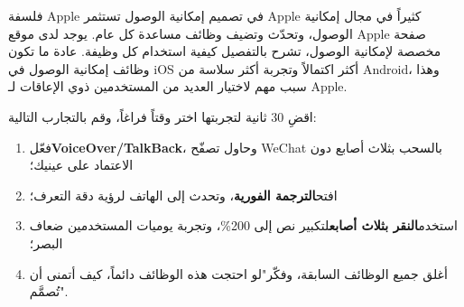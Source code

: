 \begin{tcbinfo}{فلسفة Apple في تصميم إمكانية الوصول}
تستثمر Apple كثيراً في مجال إمكانية الوصول، وتحدّث وتضيف وظائف مساعدة كل عام. يوجد لدى موقع Apple صفحة مخصصة لإمكانية الوصول، تشرح بالتفصيل كيفية استخدام كل وظيفة. عادة ما تكون وظائف إمكانية الوصول في iOS أكثر اكتمالاً وتجربة أكثر سلاسة من Android، وهذا سبب مهم لاختيار العديد من المستخدمين ذوي الإعاقات لـ Apple.

\end{tcbinfo}

\begin{tcbpractice}{اقضِ 30 ثانية لتجربتها}
اختر وقتاً فراغاً، وقم بالتجارب التالية:

\begin{enumerate}
  \item فعّل\textbf{VoiceOver/TalkBack}، وحاول تصفّح WeChat بالسحب بثلاث أصابع دون الاعتماد على عينيك؛
  \item افتح\textbf{الترجمة الفورية}، وتحدث إلى الهاتف لرؤية دقة التعرف؛
  \item استخدم\textbf{النقر بثلاث أصابع}لتكبير نص إلى 200\%، وتجربة يوميات المستخدمين ضعاف البصر؛
  \item أغلق جميع الوظائف السابقة، وفكّر"لو احتجت هذه الوظائف دائماً، كيف أتمنى أن تُصمَّم".
\end{enumerate}

\end{tcbpractice}
